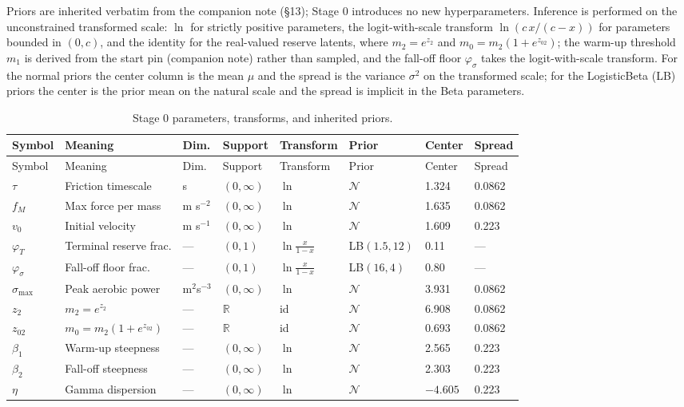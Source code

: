 \documentclass[11pt]{article}
\begin{document}
Priors are inherited verbatim from the companion note (\S13); Stage 0 introduces no new hyperparameters. Inference is performed on the unconstrained transformed scale: $\ln$ for strictly positive parameters, the logit-with-scale transform $\ln(c\,x/(c - x))$ for parameters bounded in $(0, c)$, and the identity for the real-valued reserve latents, where $m_2 = e^{z_2}$ and $m_0 = m_2(1 + e^{z_{02}})$; the warm-up threshold $m_1$ is derived from the start pin (companion note) rather than sampled, and the fall-off floor $\varphi_\sigma$ takes the logit-with-scale transform. For the normal priors the center column is the mean $\mu$ and the spread is the variance $\sigma^2$ on the transformed scale; for the LogisticBeta (LB) priors the center is the prior mean on the natural scale and the spread is implicit in the Beta parameters.

\begin{small}
\begin{longtable}{@{}p{1.7cm}p{3.4cm}p{0.9cm}p{1.4cm}p{1.6cm}p{2.1cm}p{1.0cm}p{0.9cm}@{}}
\caption{Stage 0 parameters, transforms, and inherited priors.}\label{tab:stage0}\\
\toprule
Symbol & Meaning & Dim. & Support & Transform & Prior & Center & Spread \\
\midrule
\endfirsthead
\toprule
Symbol & Meaning & Dim. & Support & Transform & Prior & Center & Spread \\
\midrule
\endhead
$\tau$ & Friction timescale & s & $(0, \infty)$ & $\ln$ & $\mathcal{N}$ & 1.324 & 0.0862 \\
$f_M$ & Max force per mass & m s$^{-2}$ & $(0, \infty)$ & $\ln$ & $\mathcal{N}$ & 1.635 & 0.0862 \\
$v_0$ & Initial velocity & m s$^{-1}$ & $(0, \infty)$ & $\ln$ & $\mathcal{N}$ & 1.609 & 0.223 \\
$\varphi_T$ & Terminal reserve frac. & --- & $(0, 1)$ & $\ln\!\frac{x}{1-x}$ & LB$(1.5, 12)$ & 0.11 & --- \\
$\varphi_\sigma$ & Fall-off floor frac. & --- & $(0, 1)$ & $\ln\!\frac{x}{1-x}$ & LB$(16, 4)$ & 0.80 & --- \\
$\sigma_{\max}$ & Peak aerobic power & m$^2$s$^{-3}$ & $(0, \infty)$ & $\ln$ & $\mathcal{N}$ & 3.931 & 0.0862 \\
$z_2$ & $m_2 = e^{z_2}$ & --- & $\mathbb{R}$ & id & $\mathcal{N}$ & 6.908 & 0.0862 \\
$z_{02}$ & $m_0 = m_2(1+e^{z_{02}})$ & --- & $\mathbb{R}$ & id & $\mathcal{N}$ & 0.693 & 0.0862 \\
$\beta_1$ & Warm-up steepness & --- & $(0, \infty)$ & $\ln$ & $\mathcal{N}$ & 2.565 & 0.223 \\
$\beta_2$ & Fall-off steepness & --- & $(0, \infty)$ & $\ln$ & $\mathcal{N}$ & 2.303 & 0.223 \\
$\eta$ & Gamma dispersion & --- & $(0, \infty)$ & $\ln$ & $\mathcal{N}$ & $-4.605$ & 0.223 \\
\bottomrule
\end{longtable}
\end{small}
\end{document}
